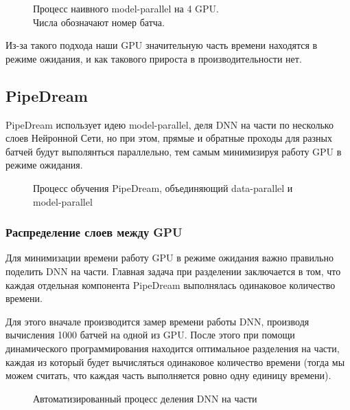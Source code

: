 \begin{figure}[h]%
	\centering
	\caption{Процесс наивного model-parallel на 4 GPU. \\Числа обозначают номер батча.}
	\label{framework} %
\end{figure}

\indent\setlength{\parindent}{1em} 
Из-за такого подхода наши GPU значительную часть времени находятся в режиме ожидания, и как такового прироста в производительности нет.

\subsection{PipeDream}
\indent\setlength{\parindent}{1em}  
PipeDream использует идею model-parallel, деля DNN на части по несколько слоев Нейронной Сети, но при этом, прямые и обратные проходы для разных батчей будут выполянться параллельно, тем самым минимизируя работу GPU в режиме ожидания.

\begin{figure}[h]%
	\centering
	\caption{Процесс обучения PipeDream, объединяющий data-parallel и model-parallel}
	\label{framework} %
\end{figure}

\newpage
\subsubsection{Распределение слоев между GPU}
\indent\setlength{\parindent}{1em}  
Для минимизации времени работу GPU в режиме ожидания важно правильно поделить DNN на части. Главная задача при разделении заключается в том, что каждая отдельная компонента PipeDream выполнялась одинаковое количество времени.

Для этого вначале производится замер времени работы DNN, производя вычисления 1000 батчей на одной из GPU. После этого при помощи динамического программирования находится оптимальное разделения на части, каждая из который будет вычисляться одинаковое количество времени (тогда мы можем считать, что каждая часть выполняется ровно одну единицу времени).

\begin{figure}[h]%
	\centering
	\caption{Автоматизированный процесс деления DNN на части}
	\label{framework} %
\end{figure}

